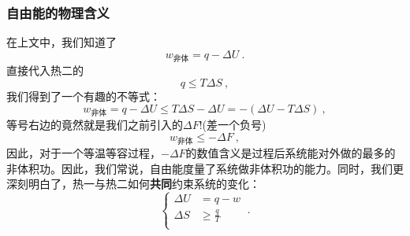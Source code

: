 \subsubsection{自由能的物理含义}
在上文中，我们知道了
$$ w_{\text{非体}} = q - \Delta U~.$$
直接代入热二的
$$
q \le T\Delta S
~,
$$
我们得到了一个有趣的不等式：
$$
w_{\text{非体}} = q - \Delta U \le T \Delta S - \Delta U = - (\Delta U-T \Delta S ) ~,
$$
等号右边的竟然就是我们之前引入的$\Delta F$!(差一个负号) 
\begin{equation}
w_\text{非体} \le - \Delta F~,
\end{equation}
因此，对于一个等温等容过程，$-\Delta F$的数值含义是过程后系统能对外做的最多的非体积功。因此，我们常说，自由能度量了系统做非体积功的能力。同时，我们更深刻明白了，热一与热二如何\textbf{共同}约束系统的变化：
\begin{equation}
\left \{
    \begin{aligned}
    \Delta U &= q-w\\
    \Delta S &\ge \frac{q}{T}\\
    \end{aligned}
\right.~.
\end{equation}




